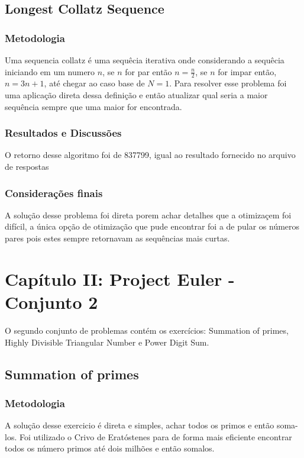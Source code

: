 \documentclass{article}
\begin{document}
    \subsection{Longest Collatz Sequence}
        
        \subsubsection{Metodologia}
        Uma sequencia collatz é uma sequêcia iterativa onde considerando a sequêcia iniciando em um numero $n$, se $n$ for par então $n = \frac{n}{2}$, se $n$ for impar então, $n = 3n + 1$, até chegar ao caso base de $N = 1$. Para resolver esse problema foi uma aplicação direta dessa definição e então atualizar qual seria a maior sequência sempre que uma maior for encontrada.
        
        \subsubsection{Resultados e Discussões}
        O retorno desse algoritmo foi de 837799, igual ao resultado fornecido no arquivo de respostas
        
        \subsubsection{Considerações finais}
        A solução desse problema foi direta porem achar detalhes que a otimizaçem foi difícil, a única opção de otimização que pude encontrar foi a de pular os números pares pois estes sempre retornavam as sequências mais curtas.

\section{Capítulo II: Project Euler - Conjunto 2}
O segundo conjunto de problemas contém os exercícios: Summation of primes, Highly Divisible Triangular Number e Power Digit Sum.
    \subsection{Summation of primes}
        
        \subsubsection{Metodologia} 
        A solução desse exercicio é direta e simples, achar todos os primos e então soma-los. Foi utilizado o Crivo de Eratóstenes para de forma mais eficiente encontrar todos os número primos até dois milhões e então somalos.
        
\end{document}
